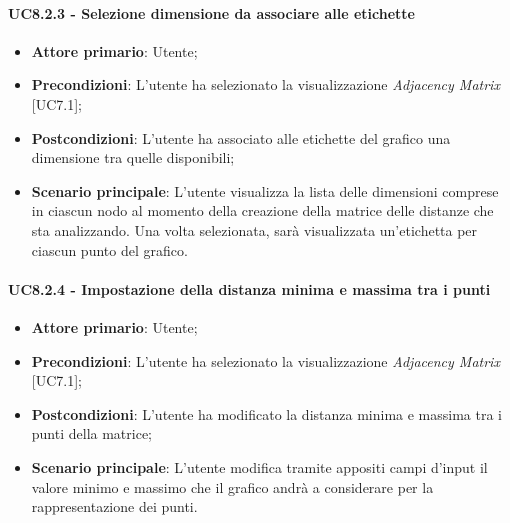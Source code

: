 \paragraph{UC8.2.3 - Selezione dimensione da associare alle etichette}
\begin{itemize}
	\item \textbf{Attore primario}: Utente;
	\item \textbf{Precondizioni}: L'utente ha selezionato la visualizzazione \textit{Adjacency Matrix} [UC7.1];
	\item \textbf{Postcondizioni}: L'utente ha associato alle etichette del grafico una dimensione tra quelle disponibili;
	
	\item \textbf{Scenario principale}: L'utente visualizza la lista delle dimensioni comprese in ciascun nodo al momento della creazione della matrice delle distanze che sta analizzando. Una volta selezionata, sarà visualizzata un'etichetta per ciascun punto del grafico.
\end{itemize}

\paragraph{UC8.2.4 - Impostazione della distanza minima e massima tra i punti}
\begin{itemize}
	\item \textbf{Attore primario}: Utente;
	\item \textbf{Precondizioni}: L'utente ha selezionato la visualizzazione \textit{Adjacency Matrix} [UC7.1];
	\item \textbf{Postcondizioni}: L'utente ha modificato la distanza minima e massima tra i punti della matrice;
	
	\item \textbf{Scenario principale}: L'utente modifica tramite appositi campi d'input il valore minimo e massimo che il grafico andrà a considerare per la rappresentazione dei punti.
\end{itemize}